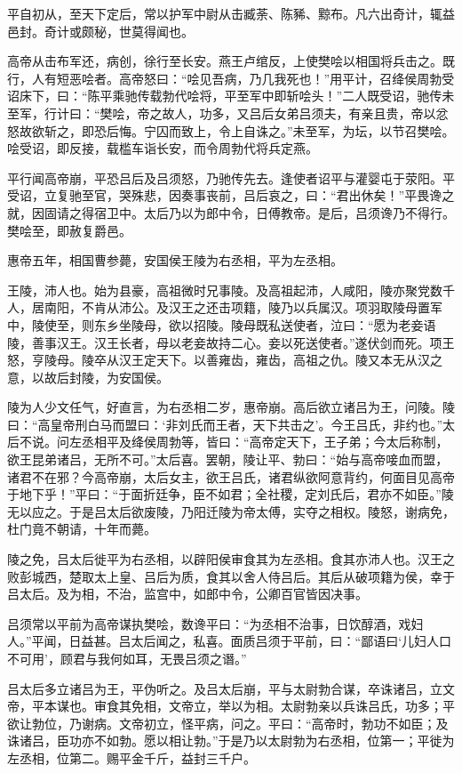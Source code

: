 \documentclass[]{article}
\begin{document}
平自初从，至天下定后，常以护军中尉从击臧荼、陈豨、黥布。凡六出奇计，辄益邑封。奇计或颇秘，世莫得闻也。

高帝从击布军还，病创，徐行至长安。燕王卢绾反，上使樊哙以相国将兵击之。既行，人有短恶哙者。高帝怒曰：``哙见吾病，乃几我死也！''用平计，召绛侯周勃受诏床下，曰：``陈平乘驰传载勃代哙将，平至军中即斩哙头！''二人既受诏，驰传未至军，行计曰：``樊哙，帝之故人，功多，又吕后女弟吕须夫，有亲且贵，帝以忿怒故欲斩之，即恐后悔。宁囚而致上，令上自诛之。''未至军，为坛，以节召樊哙。哙受诏，即反接，载槛车诣长安，而令周勃代将兵定燕。

平行闻高帝崩，平恐吕后及吕须怒，乃驰传先去。逢使者诏平与灌婴屯于荥阳。平受诏，立复驰至官，哭殊悲，因奏事丧前，吕后哀之，曰：``君出休矣！''平畏谗之就，因固请之得宿卫中。太后乃以为郎中令，日傅教帝。是后，吕须谗乃不得行。樊哙至，即赦复爵邑。

惠帝五年，相国曹参薨，安国侯王陵为右丞相，平为左丞相。

王陵，沛人也。始为县豪，高祖微时兄事陵。及高祖起沛，人咸阳，陵亦聚党数千人，居南阳，不肯从沛公。及汉王之还击项籍，陵乃以兵属汉。项羽取陵母置军中，陵使至，则东乡坐陵母，欲以招陵。陵母既私送使者，泣曰：``愿为老妾语陵，善事汉王。汉王长者，母以老妾故持二心。妾以死送使者。''遂伏剑而死。项王怒，亨陵母。陵卒从汉王定天下。以善雍齿，雍齿，高祖之仇。陵又本无从汉之意，以故后封陵，为安国侯。

陵为人少文任气，好直言，为右丞相二岁，惠帝崩。高后欲立诸吕为王，问陵。陵曰：``高皇帝刑白马而盟曰：`非刘氏而王者，天下共击之'。今王吕氏，非约也。''太后不说。问左丞相平及绛侯周勃等，皆曰：``高帝定天下，王子弟；今太后称制，欲王昆弟诸吕，无所不可。''太后喜。罢朝，陵让平、勃曰：``始与高帝唼血而盟，诸君不在邪？今高帝崩，太后女主，欲王吕氏，诸君纵欲阿意背约，何面目见高帝于地下乎！''平曰：``于面折廷争，臣不如君；全社稷，定刘氏后，君亦不如臣。''陵无以应之。于是吕太后欲废陵，乃阳迁陵为帝太傅，实夺之相权。陵怒，谢病免，杜门竟不朝请，十年而薨。

陵之免，吕太后徙平为右丞相，以辟阳侯审食其为左丞相。食其亦沛人也。汉王之败彭城西，楚取太上皇、吕后为质，食其以舍人侍吕后。其后从破项籍为侯，幸于吕太后。及为相，不治，监宫中，如郎中令，公卿百官皆因决事。

吕须常以平前为高帝谋执樊哙，数谗平曰：``为丞相不治事，日饮醇酒，戏妇人。''平闻，日益甚。吕太后闻之，私喜。面质吕须于平前，曰：``鄙语曰`儿妇人口不可用'，顾君与我何如耳，无畏吕须之谮。''

吕太后多立诸吕为王，平伪听之。及吕太后崩，平与太尉勃合谋，卒诛诸吕，立文帝，平本谋也。审食其免相，文帝立，举以为相。太尉勃亲以兵诛吕氏，功多；平欲让勃位，乃谢病。文帝初立，怪平病，问之。平曰：``高帝时，勃功不如臣；及诛诸吕，臣功亦不如勃。愿以相让勃。''于是乃以太尉勃为右丞相，位第一；平徙为左丞相，位第二。赐平金千斤，益封三千户。
\end{document}
